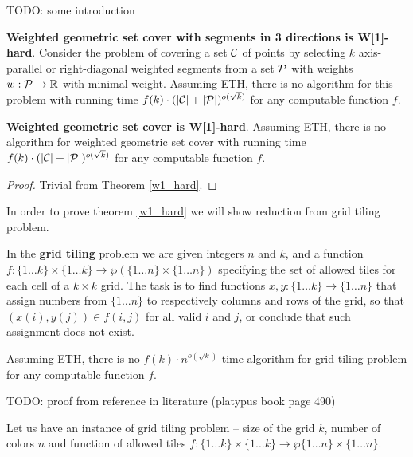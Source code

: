 TODO: some introduction

\begin{tw}
\label{w1_hard}
	\textbf{Weighted geometric set cover with segments in 3 directions is W[1]-hard}.
	Consider the problem of covering a set $\mathcal{C}$ of points
	by selecting $k$ axis-parallel or right-diagonal weighted segments
	from a set $\mathcal{P}$ 
	with weights $w : \mathcal{P} \rightarrow \mathbb{R}$
	with minimal weight.
	Assuming ETH, there is no algorithm for this
	problem with running time
	$f(k)\cdot(|\mathcal{C}| + |\mathcal{P}|)^{o(\sqrt{k})}$
	for any computable function $f$.
\end{tw}

\begin{corollary}
	\textbf{Weighted geometric set cover is W[1]-hard}.
	Assuming ETH, there is no algorithm for weighted geometric set cover
	with running time
	$f(k)\cdot(|\mathcal{C}| + |\mathcal{P}|)^{o(\sqrt{k})}$
	for any computable function $f$.
\end{corollary}

\begin{proof}
Trivial from Theorem \ref{w1_hard}. 
\end{proof}

In order to prove theorem \ref{w1_hard} we will show reduction from grid tiling problem.

\begin{defi}
In the \textbf{grid tiling} problem we are given integers $n$ and $k$,
and a function
$f : \{1 \ldots k\} \times \{1 \ldots k\} \rightarrow \wp(\{1 \ldots n\} \times \{1 \ldots n\})$
specifying the set of allowed tiles for each cell of a $k \times k$ grid.
The task is to find functions
$x,y : \{1 \ldots k\} \rightarrow \{1 \ldots n\}$
that assign numbers from $\{1 \ldots n\}$
to respectively columns and rows of the grid,
so that $(x(i), y(j)) \in f(i, j)$ for all valid $i$ and $j$,
or conclude that such assignment does not exist.
\end{defi}


\begin{tw}
\label{grid_tiling_w1_hard}
Assuming ETH, there is no $f(k)\cdot n^{o(\sqrt{k})}$-time
algorithm for grid tiling problem
for any computable function $f$.
\end{tw}

TODO: proof from reference in literature (platypus book page 490)

Let us have an instance of grid tiling problem -- size of the
grid $k$, number of colors $n$
and function of allowed tiles
$f : \{1 \ldots k\} \times \{1 \ldots k\} \rightarrow \wp\{1 \ldots n\} \times \{1 \ldots n\}$.

